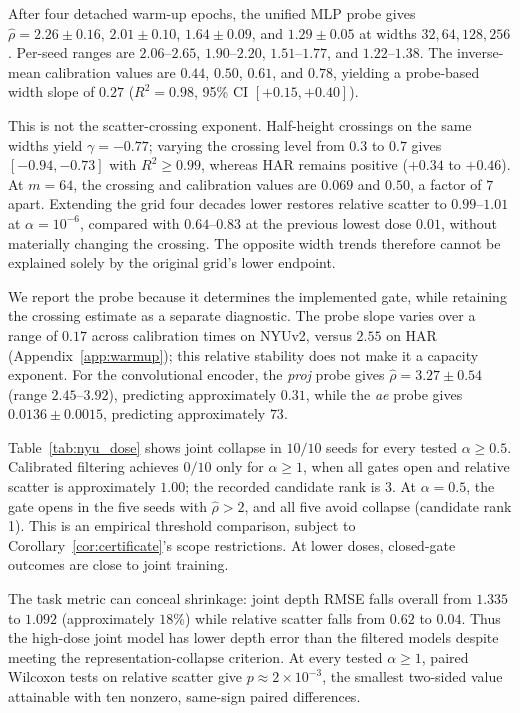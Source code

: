 \documentclass{article}
\begin{document}
After four detached warm-up epochs, the unified MLP probe gives $\hat\rho=2.26\pm0.16$, $2.01\pm0.10$, $1.64\pm0.09$, and $1.29\pm0.05$ at widths $32,64,128,256$. Per-seed ranges are $2.06$--$2.65$, $1.90$--$2.20$, $1.51$--$1.77$, and $1.22$--$1.38$. The inverse-mean calibration values are $0.44$, $0.50$, $0.61$, and $0.78$, yielding a probe-based width slope of $0.27$ ($R^2=0.98$, 95\% CI $[+0.15,+0.40]$).

This is not the scatter-crossing exponent. Half-height crossings on the same widths yield $\gamma=-0.77$; varying the crossing level from $0.3$ to $0.7$ gives $[-0.94,-0.73]$ with $R^2\ge0.99$, whereas HAR remains positive ($+0.34$ to $+0.46$). At $m=64$, the crossing and calibration values are $0.069$ and $0.50$, a factor of $7$ apart. Extending the grid four decades lower restores relative scatter to $0.99$--$1.01$ at $\alpha=10^{-6}$, compared with $0.64$--$0.83$ at the previous lowest dose $0.01$, without materially changing the crossing. The opposite width trends therefore cannot be explained solely by the original grid's lower endpoint.

We report the probe because it determines the implemented gate, while retaining the crossing estimate as a separate diagnostic. The probe slope varies over a range of $0.17$ across calibration times on NYUv2, versus $2.55$ on HAR (Appendix~\ref{app:warmup}); this relative stability does not make it a capacity exponent. For the convolutional encoder, the \emph{proj} probe gives $\hat\rho=3.27\pm0.54$ (range $2.45$--$3.92$), predicting approximately $0.31$, while the \emph{ae} probe gives $0.0136\pm0.0015$, predicting approximately $73$.

Table~\ref{tab:nyu_dose} shows joint collapse in $10/10$ seeds for every tested $\alpha\ge0.5$. Calibrated filtering achieves $0/10$ only for $\alpha\ge1$, when all gates open and relative scatter is approximately $1.00$; the recorded candidate rank is 3. At $\alpha=0.5$, the gate opens in the five seeds with $\hat\rho>2$, and all five avoid collapse (candidate rank 1). This is an empirical threshold comparison, subject to Corollary~\ref{cor:certificate}'s scope restrictions. At lower doses, closed-gate outcomes are close to joint training.

The task metric can conceal shrinkage: joint depth RMSE falls overall from $1.335$ to $1.092$ (approximately $18\%$) while relative scatter falls from $0.62$ to $0.04$. Thus the high-dose joint model has lower depth error than the filtered models despite meeting the representation-collapse criterion. At every tested $\alpha\ge1$, paired Wilcoxon tests on relative scatter give $p\approx2\times10^{-3}$, the smallest two-sided value attainable with ten nonzero, same-sign paired differences.
\end{document}
